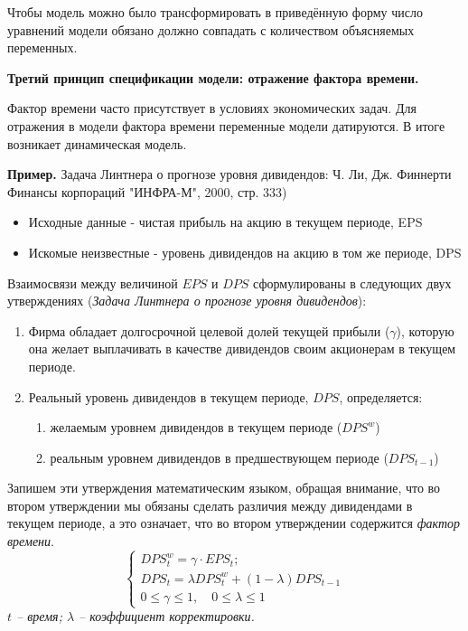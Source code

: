 \documentclass[12pt,a4paper]{article}
\begin{document}
Чтобы модель можно было трансформировать в приведённую форму число уравнений модели обязано должно совпадать с количеством объясняемых переменных.

\textbf{Третий принцип спецификации модели: отражение фактора времени.}

Фактор времени часто присутствует в условиях экономических задач. Для отражения в модели фактора времени переменные модели датируются. В итоге возникает динамическая модель.

\textbf{Пример.} Задача Линтнера о прогнозе уровня дивидендов: Ч. Ли, Дж. Финнерти Финансы корпораций "ИНФРА-М", 2000, стр. 333)
\begin{itemize}
\item Исходные данные - чистая прибыль на акцию в текущем периоде, EPS
\item Искомые неизвестные - уровень дивидендов на акцию в том же периоде, DPS
\end{itemize}

Взаимосвязи между величиной $EPS$ и $DPS$ сформулированы в следующих двух утверждениях (\textit{Задача Линтнера о прогнозе уровня дивидендов}):
\begin{enumerate}
\item Фирма обладает долгосрочной целевой долей текущей прибыли ($\gamma$), которую она желает выплачивать в качестве дивидендов своим акционерам в текущем периоде.
\item Реальный уровень дивидендов в текущем периоде, $DPS$, определяется:
	\begin{enumerate}
	\item желаемым уровнем дивидендов в текущем периоде ($DPS^w$)
	\item реальным уровнем дивидендов в предшествующем периоде ($DPS_{t-1}$)
	\end{enumerate}
\end{enumerate}

Запишем эти утверждения математическим языком, обращая внимание, что во втором утверждении мы обязаны сделать различия между дивидендами в текущем периоде, а это означает, что во втором утверждении содержится \textit{фактор времени}. 
\begin{equation}
\begin{cases}
DPS_t^w = \gamma \cdot EPS_t; \\
DPS_t = \lambda DPS_t^w + (1 - \lambda) DPS_{t-1} \\
0 \leqslant \gamma \leqslant 1, \quad 0 \leqslant \lambda \leqslant 1
\end{cases}
\end{equation}
\textit{$t$ -- время; $\lambda$ -- коэффициент корректировки.}
\end{document}
